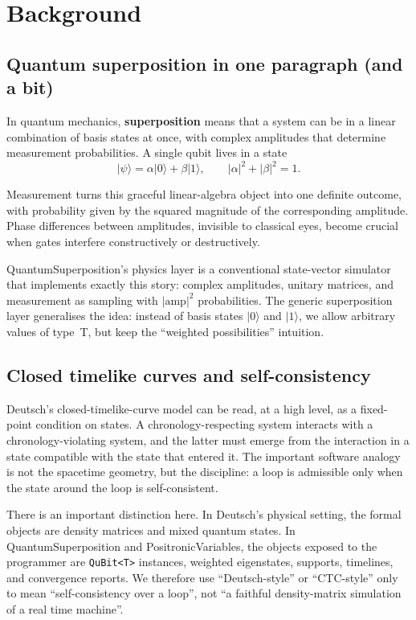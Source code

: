 \documentclass[a4paper,11pt]{article}
\begin{document}
\section{Background}

\subsection{Quantum superposition in one paragraph (and a bit)}

\newcommand{\ket}[1]{\lvert #1 \rangle}

In quantum mechanics, \textbf{superposition} means that a system can be in a linear combination of basis states at once, with complex amplitudes that determine measurement probabilities. A single qubit lives in a state
\[
\ket{\psi} = \alpha \ket{0} + \beta \ket{1},
\qquad
|\alpha|^2 + |\beta|^2 = 1.
\]

Measurement turns this graceful linear-algebra object into one definite outcome, with probability given by the squared magnitude of the corresponding amplitude. Phase differences between amplitudes, invisible to classical eyes, become crucial when gates interfere constructively or destructively.

QuantumSuperposition's physics layer is a conventional state-vector simulator that implements exactly this story: complex amplitudes, unitary matrices, and measurement as sampling with $\lvert \mathrm{amp} \rvert^{2}$ probabilities. The generic superposition layer generalises the idea: instead of basis states $\ket{0}$ and $\ket{1}$, we allow arbitrary values of type~T, but keep the ``weighted possibilities'' intuition.

\subsection{Closed timelike curves and self-consistency}

Deutsch's closed-timelike-curve model can be read, at a high level, as a fixed-point
condition on states. A chronology-respecting system interacts with a chronology-violating
system, and the latter must emerge from the interaction in a state compatible with
the state that entered it.\parencite{Deutsch91CTC} The important software analogy is
not the spacetime geometry, but the discipline: a loop is admissible only when the
state around the loop is self-consistent.

There is an important distinction here. In Deutsch's physical setting, the formal
objects are density matrices and mixed quantum states. In QuantumSuperposition and
PositronicVariables, the objects exposed to the programmer are \texttt{QuBit<T>}
instances, weighted eigenstates, supports, timelines, and convergence reports. We
therefore use ``Deutsch-style'' or ``CTC-style'' only to mean ``self-consistency over
a loop'', not ``a faithful density-matrix simulation of a real time machine''.
\end{document}
